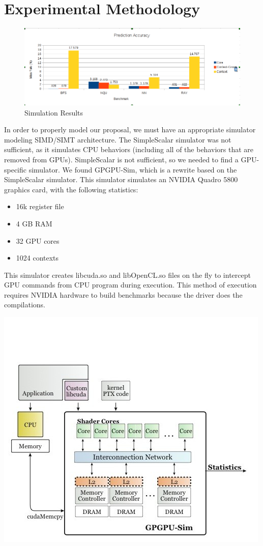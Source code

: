 \documentclass[conference]{IEEEtran}
\begin{document}
\section{Experimental Methodology}

\begin{figure}[t]
	\begin{center}
	\includegraphics[width=.8\textwidth]{data2.png}
	\end{center}
	\caption{Simulation Results}
	\label{results}
\end{figure}

In order to properly model our proposal, we must have an appropriate simulator modeling SIMD/SIMT architecture.  The SimpleScalar simulator was not sufficient, as it simulates CPU behaviors (including all of the behaviors that are removed from GPUs).  SimpleScalar is not sufficient, so we needed to find a GPU-specific simulator.  We found GPGPU-Sim, which is a rewrite based on the SimpleScalar simulator.  This simulator simulates an NVIDIA Quadro 5800 graphics card, with the following statistics:

\begin{itemize}
	\item 16k register file
	\item 4 GB RAM
	\item 32 GPU cores
	\item 1024 contexts
\end{itemize}

This simulator creates libcuda.so and libOpenCL.so files on the fly to intercept GPU commands from CPU program during execution.  This method of execution requires NVIDIA hardware to build benchmarks because the driver does the compilations.

\begin{center}
	\includegraphics[width=.45\textwidth]{uarch1.jpg}
\end{center}
\end{document}
